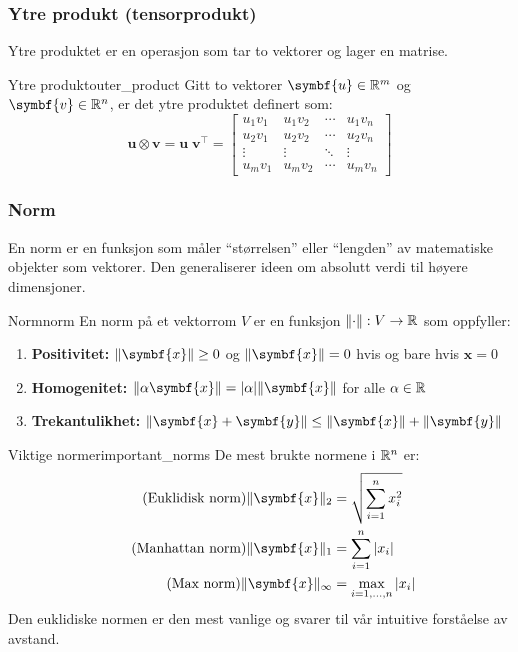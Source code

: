 \subsubsection{Ytre produkt (tensorprodukt)}
Ytre produktet er en operasjon som tar to vektorer og lager en matrise.
\begin{definition}{Ytre produkt}{outer_product}
	Gitt to vektorer \( \symbf{u} \in \R^m \) og \( \symbf{v} \in \R^n \), er det ytre produktet definert som:
	\[
		\symbf{u} \otimes \symbf{v} = \symbf{u} \; \symbf{v}^\top =
		\begin{bmatrix}
			u_1v_1 & u_1v_2 & \cdots & u_1v_n \\
			u_2v_1 & u_2v_2 & \cdots & u_2v_n \\
			\vdots & \vdots & \ddots & \vdots \\
			u_mv_1 & u_mv_2 & \cdots & u_mv_n
		\end{bmatrix}
	\]
\end{definition}

\subsubsection{Norm}
En norm er en funksjon som måler \enquote{størrelsen} eller \enquote{lengden} av matematiske objekter som vektorer. 
Den generaliserer ideen om absolutt verdi til høyere dimensjoner.

\begin{definition}{Norm}{norm}
	En norm på et vektorrom \(V\) er en funksjon \(\lVert\cdot\rVert: V \to \mathbb{R}\) som oppfyller:
	\begin{enumerate}
		\item \textbf{Positivitet:} \(\norm{\symbf{x}} \geq 0\) og \(\norm{\symbf{x}} = 0\) hvis og bare hvis \(\symbf{x} = 0\)
		\item \textbf{Homogenitet:} \(\norm{\alpha \symbf{x}} = |\alpha| \norm{\symbf{x}}\) for alle \(\alpha \in \mathbb{R}\)
		\item \textbf{Trekantulikhet:} \(\norm{\symbf{x} + \symbf{y}} \leq \norm{\symbf{x}} + \norm{\symbf{y}}\)
	\end{enumerate}
\end{definition}

\begin{remark}{Viktige normer}{important_norms}
	De mest brukte normene i \(\mathbb{R}^n\) er:
	\begin{align*}
		\tag{Euklidisk norm} \norm{\symbf{x}}_2 &= \sqrt{\sum_{i=1}^{n} x_i^2} \\
		\tag{Manhattan norm} \norm{\symbf{x}}_1 &= \sum_{i=1}^{n} |x_i| \\
		\tag{Max norm} \norm{\symbf{x}}_\infty &= \max_{i=1,\ldots,n} |x_i|
	\end{align*}
	Den euklidiske normen er den mest vanlige og svarer til vår intuitive forståelse av avstand.
\end{remark}

